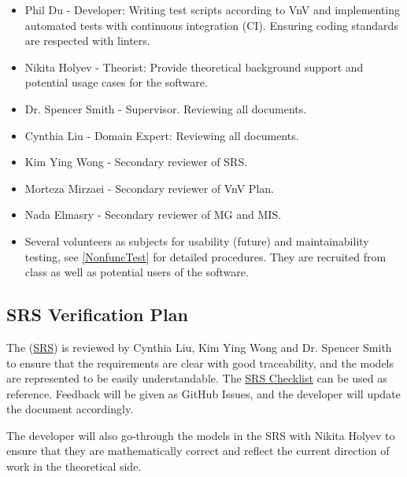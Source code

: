 \documentclass[12pt, titlepage]{article}
\begin{document}
\begin{itemize}
  \item Phil Du - Developer: Writing test scripts according to VnV and implementing automated tests with continuous integration (CI). Ensuring coding standards are respected with linters.
  \item Nikita Holyev - Theorist: Provide theoretical background support and potential usage cases for the software.
  \item Dr. Spencer Smith - Supervisor. Reviewing all documents.
  \item Cynthia Liu - Domain Expert: Reviewing all documents.
  \item Kim Ying Wong - Secondary reviewer of SRS.
  \item Morteza Mirzaei - Secondary reviewer of VnV Plan.
  \item Nada Elmasry - Secondary reviewer of MG and MIS.
  \item Several volunteers as subjects for usability (future) and maintainability testing, see \ref{NonfuncTest} for detailed procedures. They are recruited from class as well as potential users of the software.
\end{itemize}


\subsection{SRS Verification Plan}

The (\href{https://github.com/omltcat/turbulent-flow/blob/main/docs/SRS/SRS.pdf}{SRS}) is reviewed by Cynthia Liu, Kim Ying Wong and Dr. Spencer Smith to ensure that the requirements are clear with good traceability, and the models are represented to be easily understandable. The \href{https://github.com/omltcat/turbulent-flow/blob/main/docs/Checklists/SRS-Checklist.pdf}{SRS Checklist} can be used as reference. Feedback will be given as GitHub Issues, and the developer will update the document accordingly.

The developer will also go-through the models in the SRS with Nikita Holyev to ensure that they are mathematically correct and reflect the current direction of work in the theoretical side.

\end{document}
